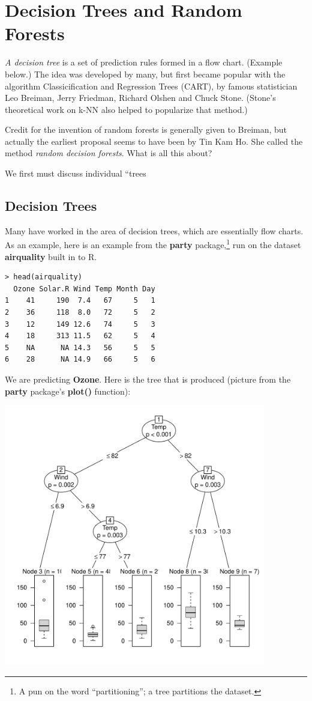 \section{Decision Trees and Random Forests}

\textit{A decision tree} is a set of prediction rules formed in a flow
chart.  (Example below.)  The idea was developed by many, but first
became popular with the algorithm Classicification and Regression Trees
(CART), by famous statistician Leo Breiman, Jerry Friedman, Richard
Olshen and Chuck Stone.  (Stone's theoretical work on k-NN also helped
to popularize that method.)

Credit for the invention of random forests is generally given to
Breiman, but actually the earliest proposal seems to have been by Tin
Kam Ho.  She called the method \textit{random decision forests}.  What
is all this about?

We first must discuss individual ``trees

\subsection{Decision Trees}

Many have worked in the area of decision trees, which are essentially
flow charts.  As an example, here is an example from the \textbf{party}
package,\footnote{A pun on the word ``partitioning''; a tree
partitions the dataset.} run on the dataset \textbf{airquality} built in
to R.

\begin{lstlisting}
> head(airquality)
  Ozone Solar.R Wind Temp Month Day
1    41     190  7.4   67     5   1
2    36     118  8.0   72     5   2
3    12     149 12.6   74     5   3
4    18     313 11.5   62     5   4
5    NA      NA 14.3   56     5   5
6    28      NA 14.9   66     5   6
\end{lstlisting}

We are predicting \textbf{Ozone}.  Here is the tree that is produced
(picture from the \textbf{party} package's \textbf{plot()} function):

\includegraphics[width=4.5in]{AirQCTree.pdf}

